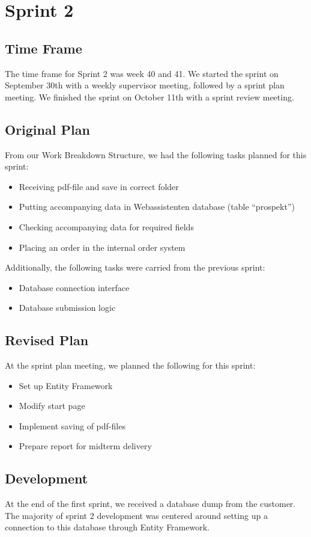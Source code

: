 \section{Sprint 2}

\subsection{Time Frame}
The time frame for Sprint 2 was week 40 and 41. We started the sprint on September 30th with a weekly supervisor meeting, followed by a sprint plan meeting. We finished the sprint on October 11th with a sprint review meeting.

\subsection{Original Plan}
From our Work Breakdown Structure, we had the following tasks planned for this sprint:
\begin{itemize}
	\item Receiving pdf-file and save in correct folder
	\item Putting accompanying data in Webassistenten database (table “prospekt”)
	\item Checking accompanying data for required fields
	\item Placing an order in the internal order system
\end{itemize}

Additionally, the following tasks were carried from the previous sprint:
\begin{itemize}
	\item Database connection interface
	\item Database submission logic
\end{itemize}

\subsection{Revised Plan}
At the sprint plan meeting, we planned the following for this sprint:
\begin{itemize}
	\item Set up Entity Framework
	\item Modify start page
	\item Implement saving of pdf-files
	\item Prepare report for midterm delivery
\end{itemize}

\subsection{Development}
At the end of the first sprint, we received a database dump from the customer. The majority of sprint 2 development was centered around setting up a connection to this database through Entity Framework.

